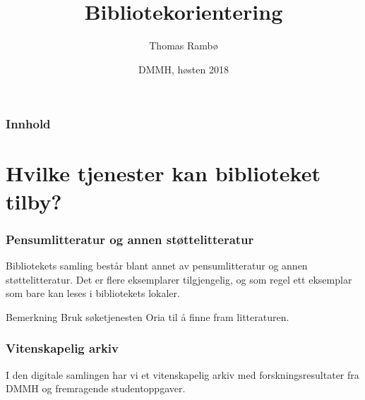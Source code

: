 \documentclass{beamer}
\title{Bibliotekorientering}
\author{Thomas Rambø\inst{1}}
\institute[DMMH-biblioteket]{
  \inst{1}
  Biblioteket\\
  Dronning Mauds Minne Høgskole
}
\date[DMMH 2018]{DMMH, høsten 2018}
\begin{document}
\frame{\titlepage}
\begin{frame}
  \frametitle{Innhold}
  \tableofcontents
\end{frame}

\section{Hvilke tjenester kan biblioteket tilby?}
\begin{frame}
  \frametitle{Pensumlitteratur og annen støttelitteratur}
  Bibliotekets samling består blant annet av \alert{pensumlitteratur} og annen \alert{støttelitteratur}. Det er flere eksemplarer tilgjengelig, og som regel ett eksemplar som bare kan leses i bibliotekets lokaler.

  \begin{block}{Bemerkning}
    Bruk søketjenesten Oria til å finne fram litteraturen.
  \end{block}
\end{frame}
  
\begin{frame}
  \frametitle{Vitenskapelig arkiv}
  I den digitale samlingen har vi et vitenskapelig arkiv med forskningsresultater fra DMMH og fremragende studentoppgaver.
\end{frame}
\end{document}
